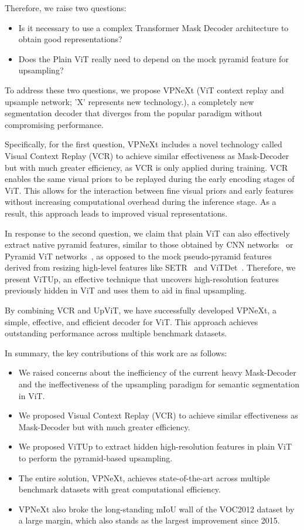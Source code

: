 Therefore, we raise two questions:
\begin{itemize}
    \item Is it necessary to use a complex Transformer Mask Decoder architecture to obtain good representations?
    \item Does the Plain ViT really need to depend on the mock pyramid feature for upsampling?
\end{itemize}

To address these two questions, we propose VPNeXt (ViT context replay and upsample network; 'X' represents new technology.), a completely new segmentation decoder that diverges from the popular paradigm without compromising performance.

Specifically, for the first question, VPNeXt includes a novel technology called Visual Context Replay (VCR) to achieve similar effectiveness as Mask-Decoder but with much greater efficiency, as  VCR is only applied during training.
%
VCR enables the same visual priors to be replayed during the early encoding stages of ViT. 
This allows for the interaction between fine visual priors and early features without increasing computational overhead during the inference stage. 
As a result, this approach leads to improved visual representations.

In response to the second question, we claim that plain ViT can also effectively extract native pyramid features, similar to those obtained by CNN networks~\cite{cVGG,cResnet,cEfficientNet} or Pyramid ViT networks~\cite{cSwin,cSegFormer,cMaxViT}, as opposed to the mock pseudo-pyramid features derived from resizing high-level features like SETR~\cite{cSETR} and ViTDet~\cite{cViTDet}.
%
Therefore, we present ViTUp, an effective technique that uncovers high-resolution features previously hidden in ViT and uses them to aid in final upsampling.

By combining VCR and UpViT, we have successfully developed VPNeXt, a simple, effective, and efficient decoder for ViT.
%
This approach achieves outstanding performance across multiple benchmark datasets. 

In summary, the key contributions of this work are as follows:

\begin{itemize}
    \item We raised concerns about the inefficiency of the current heavy Mask-Decoder and the ineffectiveness of the upsampling paradigm for semantic segmentation in ViT.
    \item We proposed Visual Context Replay (VCR) to achieve similar effectiveness as Mask-Decoder but with much greater efficiency.
    \item We proposed ViTUp to extract hidden high-resolution features in plain ViT to perform the pyramid-based upsampling.
    \item The entire solution, VPNeXt, achieves state-of-the-art across multiple benchmark datasets with great computational efficiency.
    \item VPNeXt also broke the long-standing mIoU wall of the VOC2012 dataset by a large margin, which also stands as the largest improvement since 2015.
\end{itemize}

